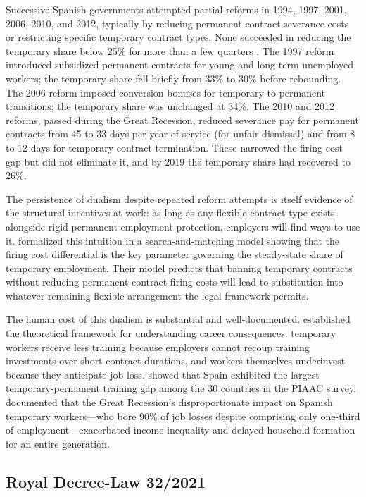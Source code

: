 \documentclass[12pt]{article}
\begin{document}
Successive Spanish governments attempted partial reforms in 1994, 1997, 2001, 2006, 2010, and 2012, typically by reducing permanent contract severance costs or restricting specific temporary contract types. None succeeded in reducing the temporary share below 25\% for more than a few quarters \citep{bentolila2019got}. The 1997 reform introduced subsidized permanent contracts for young and long-term unemployed workers; the temporary share fell briefly from 33\% to 30\% before rebounding. The 2006 reform imposed conversion bonuses for temporary-to-permanent transitions; the temporary share was unchanged at 34\%. The 2010 and 2012 reforms, passed during the Great Recession, reduced severance pay for permanent contracts from 45 to 33 days per year of service (for unfair dismissal) and from 8 to 12 days for temporary contract termination. These narrowed the firing cost gap but did not eliminate it, and by 2019 the temporary share had recovered to 26\%.

The persistence of dualism despite repeated reform attempts is itself evidence of the structural incentives at work: as long as any flexible contract type exists alongside rigid permanent employment protection, employers will find ways to use it. \citet{cahuc2002temporary} formalized this intuition in a search-and-matching model showing that the firing cost differential is the key parameter governing the steady-state share of temporary employment. Their model predicts that banning temporary contracts without reducing permanent-contract firing costs will lead to substitution into whatever remaining flexible arrangement the legal framework permits.

The human cost of this dualism is substantial and well-documented. \citet{booth2002temporary} established the theoretical framework for understanding career consequences: temporary workers receive less training because employers cannot recoup training investments over short contract durations, and workers themselves underinvest because they anticipate job loss. \citet{cabrales2017dual} showed that Spain exhibited the largest temporary-permanent training gap among the 30 countries in the PIAAC survey. \citet{jimeno2015long} documented that the Great Recession's disproportionate impact on Spanish temporary workers---who bore 90\% of job losses despite comprising only one-third of employment---exacerbated income inequality and delayed household formation for an entire generation.

\subsection{Royal Decree-Law 32/2021}
\end{document}
